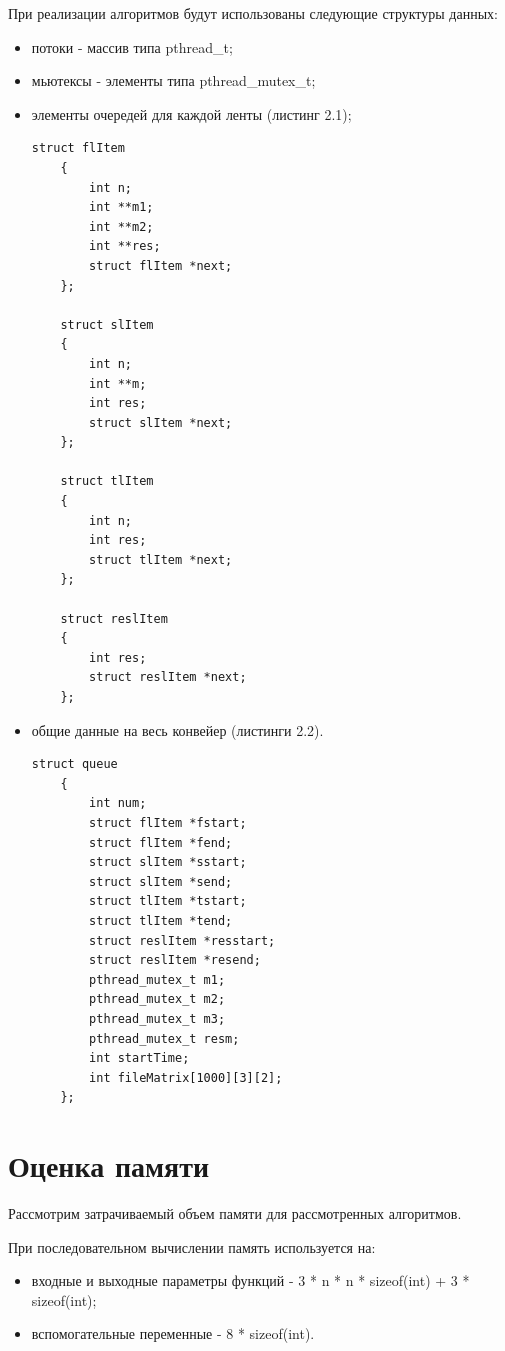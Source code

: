 При реализации алгоритмов будут использованы следующие структуры данных:
\begin{itemize}
	\item потоки - массив типа pthread\_t;
	\item мьютексы - элементы типа pthread\_mutex\_t;
	\item элементы очередей для каждой ленты (листинг 2.1);
	\captionsetup{singlelinecheck = false, justification=raggedright}
	\begin{lstlisting}[caption=Тип данных элементов очереди]
	struct flItem
	{
		int n;
		int **m1;
		int **m2;
		int **res;
		struct flItem *next;
	};
	
	struct slItem
	{
		int n;
		int **m;
		int res;
		struct slItem *next;
	};
	
	struct tlItem
	{
		int n;
		int res;
		struct tlItem *next;
	};
	
	struct reslItem
	{
		int res;
		struct reslItem *next;
	};
	\end{lstlisting}
	\captionsetup{singlelinecheck = false, justification=centering}
	\item общие данные на весь конвейер (листинги 2.2).\newpage
	\captionsetup{singlelinecheck = false, justification=raggedright}
	\begin{lstlisting}[caption=Тип данных для общей информации по конвейеру]
	struct queue
	{
		int num;
		struct flItem *fstart;
		struct flItem *fend;
		struct slItem *sstart;
		struct slItem *send;
		struct tlItem *tstart;
		struct tlItem *tend;
		struct reslItem *resstart;
		struct reslItem *resend;
		pthread_mutex_t m1;
		pthread_mutex_t m2;
		pthread_mutex_t m3;
		pthread_mutex_t resm;
		int startTime;
		int fileMatrix[1000][3][2];
	};
	\end{lstlisting}
	\captionsetup{singlelinecheck = false, justification=centering}
\end{itemize}

\section{Оценка памяти}

Рассмотрим затрачиваемый объем памяти для рассмотренных алгоритмов. 

При последовательном вычислении память используется на:
\begin{itemize}
	\item входные и выходные параметры функций - 3 * n * n * sizeof(int) + 3 * sizeof(int);
	\item вспомогательные переменные - 8 * sizeof(int).
\end{itemize}


